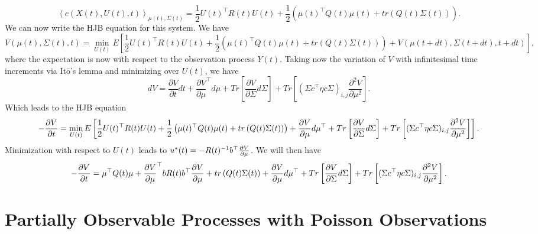 $$
\left<c(X(t),U(t),t)\right>_{\mu(t),\Sigma(t)} = \frac{1}{2} U(t)^\top R(t) U(t) + \frac{1}{2}\left(\mu(t)^\top Q(t) \mu(t) + tr\left(Q(t)\Sigma(t)\right)\right).
$$
We can now write the HJB equation for this system. We have
$$
V(\mu(t),\Sigma(t),t) = \min_{U(t)} E\left[\frac{1}{2} U(t)^\top R(t) U(t)+\frac{1}{2}\left(\mu(t)^\top Q(t) \mu(t) + tr\left(Q(t)\Sigma(t)\right)\right)+V(\mu(t+dt),\Sigma(t+dt),t+dt)\right],
$$
where the expectation is now with respect to the observation process $Y(t)$.
Taking now the variation of $V$ with infinitesimal time increments via It\=o's lemma and minimizing over $U(t)$, we have
$$
dV = \frac{\partial V}{\partial t} dt + \frac{\partial V}{\partial \mu}^\top d\mu + Tr\left[\frac{\partial V}{\partial \Sigma}d\Sigma\right] + Tr\left[(\Sigma c^\top \eta c \Sigma)_{i,j} \frac{\partial^2 V}{\partial \mu^2}\right].
$$
Which leads to the HJB equation
\[
-\frac{\partial V}{\partial t} = \min_{U(t)} E\left[\frac{1}{2} U(t)^\top R(t) U(t)+\frac{1}{2}\left(\mu(t)^\top Q(t) \mu(t) + tr\left(Q(t)\Sigma(t)\right)\right) +\frac{\partial V}{\partial \mu}d\mu^\top + Tr\left[\frac{\partial V}{\partial \Sigma}d\Sigma\right] + Tr\left[(\Sigma c^\top \eta c \Sigma)_{i,j} \frac{\partial^2 V}{\partial \mu^2}\right] \right].
\]
Minimization with respect to $U(t)$ leads to $u^*(t) = -R(t)^{-1} b^\top \frac{\partial V}{\partial \mu}$. We will then have
\[
-\frac{\partial V}{\partial t} = \mu^\top Q(t)\mu + \frac{\partial V}{\partial \mu}^\top b R(t) b^\top \frac{\partial V}{\partial \mu} + tr\left(Q(t)\Sigma(t)\right) +\frac{\partial V}{\partial \mu}d\mu^\top + Tr\left[\frac{\partial V}{\partial \Sigma}d\Sigma\right] + Tr\left[(\Sigma c^\top \eta c \Sigma)_{i,j} \frac{\partial^2 V}{\partial \mu^2}\right] .
\]
\section{Partially Observable Processes with Poisson Observations}

